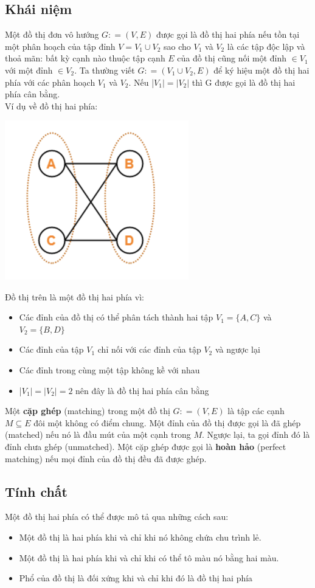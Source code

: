 \documentclass[a4paper, 12pt]{report}
\begin{document}
\subsection{Khái niệm}
Một đồ thị đơn vô hướng $G: = (V,E)$ được gọi là đồ thị hai phía nếu tồn tại một phân hoạch của tập đỉnh $V=V_1 \cup V_2$ sao cho $V_{1}$ và $V_{2}$ là các tập độc lập và thoả mãn: bất kỳ cạnh nào thuộc tập cạnh $E$ của đồ thị cũng nối một đỉnh $\in V_1$ với một đỉnh $\in V_2$.  Ta thường viết $G: = (V_{1} \cup V_{2},E)$ để ký hiệu một đồ thị hai phía với các phân hoạch $V_1$ và $V_2$. Nếu |$ V_{1} | = | V_{2} |$ thì G được gọi là đồ thị hai phía cân bằng. \\
Ví dụ về đồ thị hai phía: 
\begin{center}
	\includegraphics[width=8cm]{ex1}\\
\end{center}
Đồ thị trên là một đồ thị hai phía vì:
\begin{itemize}
	\item Các đỉnh của đồ thị có thể phân tách thành hai tập $V_1=\{A,C\}$ và $V_2=\{B,D\}$ 
	\item Các đỉnh của tập $V_1$ chỉ nối với các đỉnh của tập $V_2$ và ngược lại
	\item Các đỉnh trong cùng một tập không kề với nhau 
	\item |$ V_{1} | = | V_{2} | =2$ nên đây là đồ thị hai phía cân bằng
\end{itemize}

Một \textbf{cặp ghép} (matching) trong một đồ thị $G: = (V,E)$ là tập các cạnh $M \subseteq E$ đôi một không có điểm chung. Một đỉnh của đồ thị được gọi là đã ghép (matched) nếu nó là đầu mút của một cạnh trong $M$. Ngược lại, ta gọi đỉnh đó là đỉnh chưa ghép (unmatched). Một cặp ghép được gọi là \textbf{hoàn hảo} (perfect matching) nếu mọi đỉnh của đồ thị đều đã được ghép.
\subsection{Tính chất}
Một đồ thị hai phía có thể được mô tả qua những cách sau: 
\begin{itemize}
	\item Một đồ thị là hai phía khi và chỉ khi nó không chứa chu trình lẻ.
	\item Một đồ thị là hai phía khi và chỉ khi có thể tô màu nó bằng hai màu.
	\item Phổ của đồ thị là đối xứng khi và chỉ khi đó là đồ thị hai phía


\end{itemize}
\end{document}
